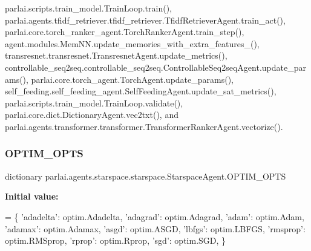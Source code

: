 parlai.\+scripts.\+train\+\_\+model.\+Train\+Loop.\+train(), parlai.\+agents.\+tfidf\+\_\+retriever.\+tfidf\+\_\+retriever.\+Tfidf\+Retriever\+Agent.\+train\+\_\+act(), parlai.\+core.\+torch\+\_\+ranker\+\_\+agent.\+Torch\+Ranker\+Agent.\+train\+\_\+step(), agent.\+modules.\+Mem\+N\+N.\+update\+\_\+memories\+\_\+with\+\_\+extra\+\_\+features\+\_\+(), transresnet.\+transresnet.\+Transresnet\+Agent.\+update\+\_\+metrics(), controllable\+\_\+seq2seq.\+controllable\+\_\+seq2seq.\+Controllable\+Seq2seq\+Agent.\+update\+\_\+params(), parlai.\+core.\+torch\+\_\+agent.\+Torch\+Agent.\+update\+\_\+params(), self\+\_\+feeding.\+self\+\_\+feeding\+\_\+agent.\+Self\+Feeding\+Agent.\+update\+\_\+sat\+\_\+metrics(), parlai.\+scripts.\+train\+\_\+model.\+Train\+Loop.\+validate(), parlai.\+core.\+dict.\+Dictionary\+Agent.\+vec2txt(), and parlai.\+agents.\+transformer.\+transformer.\+Transformer\+Ranker\+Agent.\+vectorize().

\mbox{\label{classparlai_1_1agents_1_1starspace_1_1starspace_1_1StarspaceAgent_ab9c156709a8072a6cddf7216396f610a}} 
\subsubsection{\texorpdfstring{O\+P\+T\+I\+M\+\_\+\+O\+P\+TS}{OPTIM\_OPTS}}
{\footnotesize\ttfamily dictionary parlai.\+agents.\+starspace.\+starspace.\+Starspace\+Agent.\+O\+P\+T\+I\+M\+\_\+\+O\+P\+TS\hspace{0.3cm}{\ttfamily [static]}}

{\bfseries Initial value\+:}
\begin{DoxyCode}
=  \{
        \textcolor{stringliteral}{'adadelta'}: optim.Adadelta,
        \textcolor{stringliteral}{'adagrad'}: optim.Adagrad,
        \textcolor{stringliteral}{'adam'}: optim.Adam,
        \textcolor{stringliteral}{'adamax'}: optim.Adamax,
        \textcolor{stringliteral}{'asgd'}: optim.ASGD,
        \textcolor{stringliteral}{'lbfgs'}: optim.LBFGS,
        \textcolor{stringliteral}{'rmsprop'}: optim.RMSprop,
        \textcolor{stringliteral}{'rprop'}: optim.Rprop,
        \textcolor{stringliteral}{'sgd'}: optim.SGD,
    \}
\end{DoxyCode}


